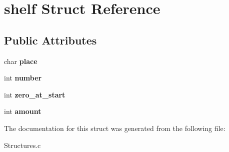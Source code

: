 \hypertarget{structshelf}{}\section{shelf Struct Reference}
\label{structshelf}
\subsection*{Public Attributes}
\begin{DoxyCompactItemize}
\item 
\hypertarget{structshelf_a86b45d4097e9d71e921d8173358d7c75}{}char {\bfseries place}\label{structshelf_a86b45d4097e9d71e921d8173358d7c75}

\item 
\hypertarget{structshelf_a5816142ce5d10212354fae0190bd83bf}{}int {\bfseries number}\label{structshelf_a5816142ce5d10212354fae0190bd83bf}

\item 
\hypertarget{structshelf_acfc8debf80e4ceb9f27b11b5a350832a}{}int {\bfseries zero\+\_\+at\+\_\+start}\label{structshelf_acfc8debf80e4ceb9f27b11b5a350832a}

\item 
\hypertarget{structshelf_a6a1b09835f421eb1aa0d752411484733}{}int {\bfseries amount}\label{structshelf_a6a1b09835f421eb1aa0d752411484733}

\end{DoxyCompactItemize}


The documentation for this struct was generated from the following file\+:\begin{DoxyCompactItemize}
\item 
Structures.\+c\end{DoxyCompactItemize}
